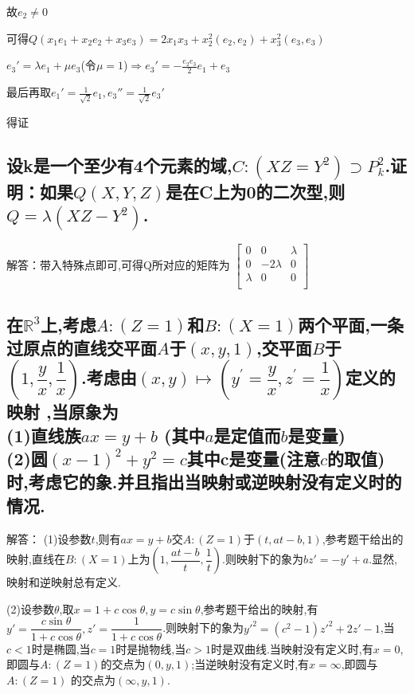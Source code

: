 \documentclass[UTF8]{book}
\begin{document}
				
				故$e_{2}\ne 0$
				
				
				可得$Q(x_{1} e_{1} + x_{2} e_{2}+x_{3} e_{3} )=2 x_{1}x_{3}+x_{2}^{2} (e_{2},e_{2} )+ x_{3}^{2}(e_{3},e_{3} )$
				
				
				$e_{3}'=\lambda e_{1}+\mu e_{3}$(令$\mu=1$)$\Rightarrow e_{3} '=- \frac{e_{2}e_{3}}{2} e_{1}+e_{3}$
				
				
				最后再取$e_{1}'= \frac{1}{\sqrt{2}} e_{1},e_{3} ''= \frac{1}{\sqrt{2}} e_{3}'$
				
				
				得证
		\subsection{设k是一个至少有4个元素的域,$C:(XZ=Y^{2})\supset P^{2}_{k}$.证明：如果$ Q(X,Y,Z) $是在C上为0的二次型,则$ Q=\lambda(XZ-Y^{2}) $.}
			解答：带入特殊点即可,可得Q所对应的矩阵为
			$\begin{bmatrix}
			    0&0&\lambda\\
			    0&-2\lambda&0\\
			    \lambda&0&0\\
			\end{bmatrix}$
		\subsection{在$ \mathbb{R}^{3} $上,考虑$ A:(Z = 1) $和$ B:(X = 1) $两个平面,一条过原点的直线交平面$ A $于$ (x,y,1) $,交平面$ B $于 $ (1,\dfrac{y}{x},\dfrac{1}{x}) $.考虑由$(x, y) \mapsto\left(y^{\prime}=\dfrac{y}{x}, z^{\prime}=\dfrac{1}{x}\right)$定义的映射 ,当原象为\\
		(1)直线族$ ax = y + b $ (其中$ a $是定值而$ b $是变量)\\
		(2)圆$(x-1)^{2}+y^{2}=c$其中c是变量(注意$ c $的取值)\\
		时,考虑它的象.并且指出当映射或逆映射没有定义时的情况.}
		
			解答：
			(1)设参数$ t $,则有$ ax = y + b $交$ A:(Z = 1) $于$ (t,at-b,1) $,参考题干给出的映射,直线在$ B:(X = 1) $上为$ (1,\dfrac{at-b}{t},\dfrac{1}{t}) $.则映射下的象为$ bz' = -y' + a $.显然,映射和逆映射总有定义.
			
			
			(2)设参数$ \theta $,取$ x = 1 + c\cos\theta,y = c\sin\theta $,参考题干给出的映射,有$ y' = \dfrac{c\sin\theta}{1+c\cos\theta},z' = \dfrac{1}{1+c\cos\theta} $.则映射下的象为$ y'^{2} = (c^{2}-1)z'^{2} +2z' -1 $,当$ c<1 $时是椭圆,当$ c = 1 $时是抛物线,当$ c>1 $时是双曲线.当映射没有定义时,有$ x = 0 $,即圆与$ A:(Z = 1) $的交点为$ (0,y,1) $;当逆映射没有定义时,有$ x = \infty $,即圆与$ A:(Z = 1) $ 的交点为$ (\infty,y,1) $.
		
\end{document}
